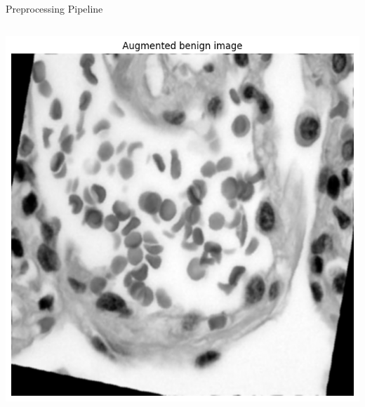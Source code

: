 \documentclass[aspectratio=169,8pt]{beamer}  %
\begin{document}
\begin{frame}{Preprocessing Pipeline}
\begin{columns}[T]
\begin{column}{0.5\textwidth}
\hfill\includegraphics[width=0.95\linewidth, height=0.45\textheight]{imgs/augmented_image.png}
\end{column}
\end{columns}
\end{frame}
\end{document}
